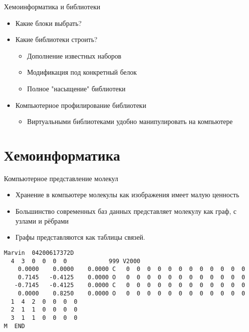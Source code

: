 \begin{frame}{Хемоинформатика и библиотеки}
    \begin{itemize}
        \item Какие блоки выбрать?
        \item Какие библиотеки строить?
            \begin{itemize}
                \item Дополнение известных  наборов
                \item Модификация под конкретный белок
                \item Полное "насыщение" библиотеки
            \end{itemize}
        \item Компьютерное профилирование библиотеки
            \begin{itemize}
                \item Виртуальными библиотеками удобно манипулировать на компьютере
            \end{itemize}
    \end{itemize}
\end{frame}



\section{Хемоинформатика}

\begin{frame}[fragile]{Компьютерное представление молекул}
	\begin{itemize}
		\item Хранение в компьютере молекулы как изображения имеет малую ценность
		\item Большинство современных баз данных представляет молекулу как граф, с узлами и рёбрами
		\item Графы представляются как таблицы связей. 
	\end{itemize}
	\small
\begin{verbatim}
Marvin  04200617372D          
  4  3  0  0  0  0            999 V2000 
    0.0000    0.0000    0.0000 C   0  0  0  0  0  0  0  0  0  0  0  0
    0.7145   -0.4125    0.0000 O   0  0  0  0  0  0  0  0  0  0  0  0
   -0.7145   -0.4125    0.0000 C   0  0  0  0  0  0  0  0  0  0  0  0
    0.0000    0.8250    0.0000 O   0  0  0  0  0  0  0  0  0  0  0  0
  1  4  2  0  0  0  0
  2  1  1  0  0  0  0
  3  1  1  0  0  0  0
M  END  
\end{verbatim}

\end{frame}

